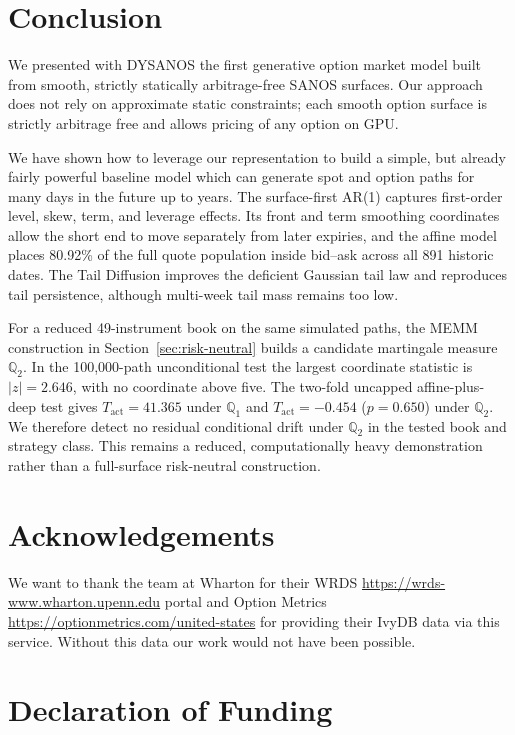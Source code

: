 \documentclass[11pt,a4paper]{article}
\newcommand{\Q}{\mathbb{Q}}
\renewcommand{\Q}{\mathbb{Q}}
\begin{document}
\section{Conclusion}

We presented with DYSANOS the first generative option market model built from
smooth, strictly statically arbitrage-free SANOS surfaces. Our approach does not rely on
approximate static constraints; each smooth option surface is strictly arbitrage free and allows
pricing of any option on GPU.

We have shown how
to leverage our representation to build a simple, but already fairly powerful baseline
model which can generate spot and option paths for many days in the future up to years.
The surface-first AR(1) captures first-order level, skew, term, and leverage
effects.  Its front and term smoothing coordinates allow the short end to move
separately from later expiries, and the affine model places
80.92\% of the full quote population inside bid--ask across all 891 historic dates. The Tail Diffusion
improves the deficient Gaussian
tail law and reproduces tail persistence, although multi-week tail mass
remains too low.

For a reduced 49-instrument book on the same simulated paths, the MEMM
construction in Section~\ref{sec:risk-neutral} builds a candidate
martingale measure~$\Q_2$.  In the 100,000-path unconditional test the
largest coordinate statistic is $|z|=2.646$, with no coordinate above five.
The two-fold uncapped affine-plus-deep test gives $T_{\mathrm{act}}=41.365$
under $\Q_1$ and $T_{\mathrm{act}}=-0.454$ ($p=0.650$) under $\Q_2$.  We
therefore detect no residual conditional drift under $\Q_2$ in the tested book
and strategy class.  This remains a reduced, computationally heavy
demonstration rather than a full-surface risk-neutral construction.

\section*{Acknowledgements}

We want to thank the team at Wharton for their WRDS \url{https://wrds-www.wharton.upenn.edu} portal and Option Metrics \url{https://optionmetrics.com/united-states}
for providing their IvyDB data via this service. Without this data our work would not have been possible.

\section*{Declaration of Funding}
\end{document}
